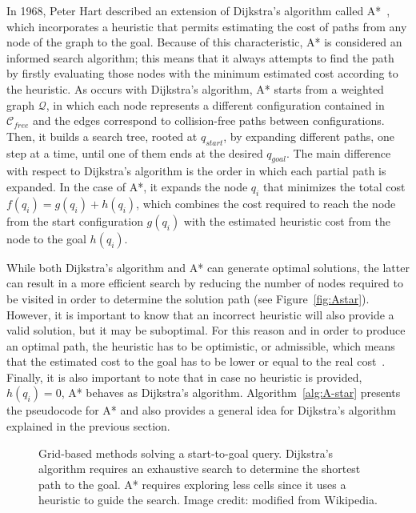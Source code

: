 In 1968, Peter Hart \etal described an extension of Dijkstra's algorithm called
A*~\cite{Hart1968}, which incorporates a heuristic that permits estimating the
cost of paths from any node of the graph to the goal. Because of this
characteristic, A* is considered an informed search algorithm; this means that
it always attempts to find the path by firstly evaluating those nodes with the
minimum estimated cost according to the heuristic. As occurs with Dijkstra's
algorithm, A* starts from a weighted graph $\mathcal{Q}$, in which each node
represents a different configuration contained in $\mathcal{C}_{free}$ and the
edges correspond to collision-free paths between configurations. Then, it builds
a search tree, rooted at $q_{start}$, by expanding different paths, one step at
a time, until one of them ends at the desired $q_{goal}$. The main difference
with respect to Dijkstra's algorithm is the order in which each partial path is
expanded. In the case of A*, it expands the node $q_i$ that minimizes the total
cost $f(q_i) = g(q_i) + h(q_i)$, which combines the cost required to reach the
node from the start configuration $g(q_i)$ with the estimated heuristic cost
from the node to the goal $h(q_i)$.

While both Dijkstra's algorithm and A* can generate optimal solutions, the
latter can result in a more efficient search by reducing the number of nodes
required to be visited in order to determine the solution path (see
Figure~\ref{fig:Astar}). However, it is important to know that an
incorrect heuristic will also provide a valid solution, but it may be
suboptimal. For this reason and in order to produce an optimal path, the
heuristic has to be optimistic, or admissible, which means that the estimated
cost to the goal has to be lower or equal to the real cost~\cite{Choset2005}.
Finally, it is also important to note that in case no heuristic is provided, \ie
$h(q_i)=0$, A* behaves as Dijkstra's algorithm. Algorithm~\ref{alg:A-star}
presents the pseudocode for A* and also provides a general idea for Dijkstra's
algorithm explained in the previous section.

\begin{figure}[htbp]
    \myfloatalign
     \quad
\caption[Comparison between Dijkstra's algorithm and A*.]
{Grid-based methods solving a start-to-goal query.
\protect {} Dijkstra's algorithm requires an exhaustive
search to determine the shortest path to the goal.
\protect {} A* requires exploring less cells since it uses a
heuristic to guide the search. Image credit: modified from Wikipedia.}
\label{fig:Dijkstra-Astar}
\end{figure}

